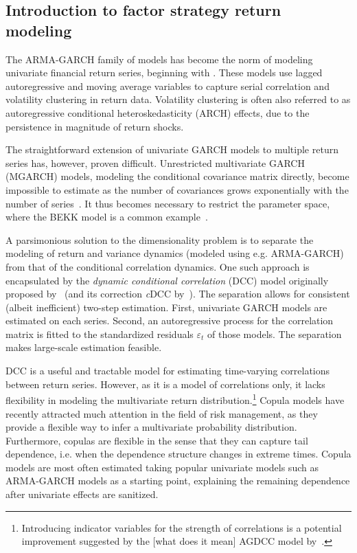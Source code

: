 
\subsection{Introduction to factor strategy return modeling}
\label{subsec:intro_copula}

The ARMA-GARCH family of models has become the norm of modeling univariate financial return series, beginning with \textcite{Bollerslev1986}. These models use lagged autoregressive and moving average variables to capture serial correlation and volatility clustering in return data. Volatility clustering is often also referred to as autoregressive conditional heteroskedasticity (ARCH) effects, due to the persistence in magnitude of return shocks.

The straightforward extension of univariate GARCH models to multiple return series has, however, proven difficult. Unrestricted multivariate GARCH (MGARCH) models, modeling the conditional covariance matrix directly, become impossible to estimate as the number of covariances grows exponentially with the number of series~\autocite{WhyMGARCHSucks}. It thus becomes necessary to restrict the parameter space, where the BEKK model is a common example~\autocite{BEKKModel}.

A parsimonious solution to the dimensionality problem is to separate the modeling of return and variance dynamics (modeled using e.g. ARMA-GARCH) from that of the conditional correlation dynamics. One such approach is encapsulated by the \emph{dynamic conditional correlation} (DCC) model originally proposed by~\autocite{Engle2002} (and its correction \emph{c}DCC by~\autocite{Aielli2013}). The separation allows for consistent (albeit inefficient) two-step estimation. First, univariate GARCH models are estimated on each series. Second, an autoregressive process for the correlation matrix is fitted to the standardized residuals $\varepsilon_t$ of those models. The separation makes large-scale estimation feasible.

DCC is a useful and tractable model for estimating time-varying correlations between return series. However, as it is a model of correlations only, it lacks flexibility in modeling the multivariate return distribution.\footnote{Introducing indicator variables for the strength of correlations is a potential improvement suggested by the [what does it mean] AGDCC model by~\autocite{Cappiello2006}.} Copula models have recently attracted much attention in the field of risk management, as they provide a flexible way to infer a multivariate probability distribution. Furthermore, copulas are flexible in the sense that they can capture tail dependence, i.e. when the dependence structure changes in extreme times. Copula models are most often estimated taking popular univariate models such as ARMA-GARCH models as a starting point, explaining the remaining dependence after univariate effects are sanitized. 

